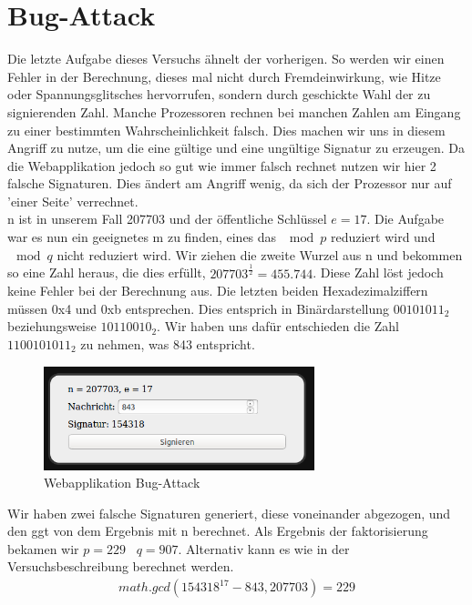 \documentclass{article}
\begin{document}
\section{Bug-Attack}
Die letzte Aufgabe dieses Versuchs ähnelt der vorherigen. So werden wir einen Fehler in der Berechnung, dieses mal nicht durch Fremdeinwirkung, wie Hitze oder Spannungsglitsches hervorrufen, sondern durch geschickte Wahl der zu signierenden Zahl. Manche Prozessoren rechnen bei manchen Zahlen am Eingang zu einer bestimmten Wahrscheinlichkeit falsch. Dies machen wir uns in diesem Angriff zu nutze, um die eine gültige und eine ungültige Signatur zu erzeugen. Da die Webapplikation jedoch so gut wie immer falsch rechnet nutzen wir hier 2 falsche Signaturen. Dies ändert am Angriff wenig, da sich der Prozessor nur auf 'einer Seite' verrechnet.\\
n ist in unserem Fall 207703 und der öffentliche Schlüssel $e = 17$. Die Aufgabe war es nun ein geeignetes m zu finden, eines das $\mod{p}$ reduziert wird und $\mod{q}$ nicht reduziert wird. Wir ziehen die zweite Wurzel aus n und bekommen so eine Zahl heraus, die dies erfüllt, $207703^{\frac{1}{2}}=455.744$. Diese Zahl löst jedoch keine Fehler bei der Berechnung aus. Die letzten beiden Hexadezimalziffern müssen 0x4 und 0xb entsprechen. Dies entsprich in Binärdarstellung $00101011_2$ beziehungsweise $10110010_2$. Wir haben uns dafür entschieden die Zahl $1100101011_2$ zu nehmen, was 843 entspricht.
\begin{figure}[H]
\centering
\includegraphics[width=0.7\textwidth]{3_2.png}
\caption{Webapplikation Bug-Attack}
\label{fig:2}
\end{figure}
Wir haben zwei falsche Signaturen generiert, diese voneinander abgezogen, und den ggt von dem Ergebnis mit n berechnet. Als Ergebnis der faktorisierung bekamen wir $p = 229 \;\;\; q = 907$. Alternativ kann es wie in der Versuchsbeschreibung berechnet werden. 
\begin{align}
math.gcd(154318^{17}-843,207703) = 229
\end{align}
\newpage
\end{document}
